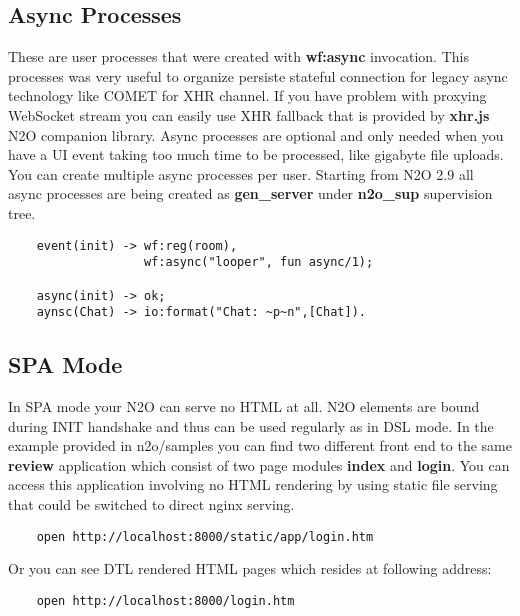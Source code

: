 \subsection{Async Processes}
These are user processes that were created with {\bf wf:async} invocation.
This processes was very useful to organize persiste stateful connection
for legacy async technology like COMET for XHR channel. If you have problem with
proxying WebSocket stream you can easily use XHR fallback that is
provided by {\bf xhr.js} N2O companion library.
Async processes are optional and only needed when you have a UI event taking too much
time to be processed, like gigabyte file uploads. You can create
multiple async processes per user. Starting from N2O 2.9 all async
processes are being created as {\bf gen\_server} under
{\bf n2o\_sup} supervision tree.

\vspace{1\baselineskip}
\begin{lstlisting}
    event(init) -> wf:reg(room),
                   wf:async("looper", fun async/1);

    async(init) -> ok;
    aynsc(Chat) -> io:format("Chat: ~p~n",[Chat]).
\end{lstlisting}
\vspace{1\baselineskip}

\newpage
\subsection{SPA Mode}
In SPA mode your N2O can serve no HTML at all. N2O elements are
bound during INIT handshake and thus can be used regularly as in DSL mode.
In the example provided in n2o/samples you can find two different
front end to the same {\bf review} application which consist of
two page modules {\bf index} and {\bf login}. You can access this application
involving no HTML rendering by using static file serving that could be
switched to direct nginx serving.

\begin{lstlisting}
    open http://localhost:8000/static/app/login.htm
\end{lstlisting}

Or you can see DTL rendered HTML pages which resides at following address:

\begin{lstlisting}
    open http://localhost:8000/login.htm
\end{lstlisting}

